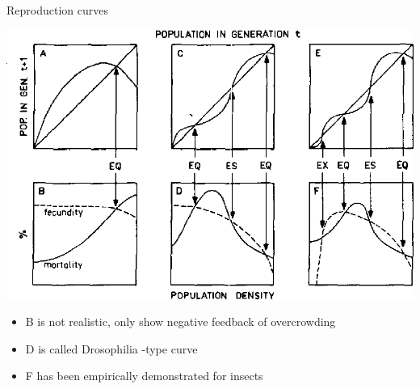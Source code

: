 \documentclass[11,aspectratio=1610]{beamer}
\begin{document}
\begin{frame}{Reproduction curves}


\centering
\includegraphics[height=0.5\textheight]{img/reproduction_curves.png}
\begin{footnotesize}
\begin{itemize}
\item B is not realistic, only show negative feedback of overcrowding
\item D is called \alert{Drosophilia -type} curve
\item F has been empirically demonstrated for \alert{insects}
\end{itemize}

  \end{footnotesize}

\end{frame}
\end{document}
